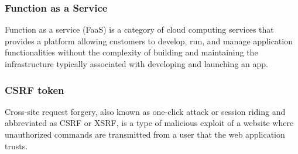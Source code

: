 \subsubsection*{Function as a Service}

Function as a service (FaaS) is a category of cloud computing services that provides a platform allowing customers to develop, run, and manage application functionalities without the complexity of building and maintaining the infrastructure typically associated with developing and launching an app.\cite{roberts_2018}

\subsubsection*{CSRF token}

Cross-site request forgery, also known as one-click attack or session riding and abbreviated as CSRF or XSRF, is a type of malicious exploit of a website where unauthorized commands are transmitted from a user that the web application trusts.\cite{Ristic2005}